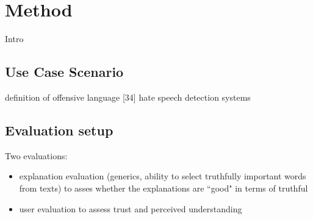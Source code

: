 \section{Method}
Intro

\subsection{Use Case Scenario}
definition of offensive language [34] \newline
hate speech detection systems \newline

\subsection{Evaluation setup}
Two evaluations: 
\begin{itemize}
	\item explanation evaluation (generics, ability to select truthfully important words from texts) to asses whether the explanations are ``good" in terms of truthful
	\item user evaluation to assess trust and perceived understanding
\end{itemize}







